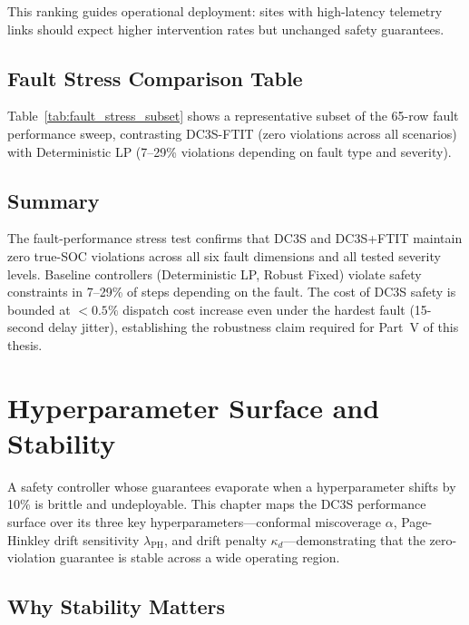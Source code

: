 This ranking guides operational deployment: sites with high-latency
telemetry links should expect higher intervention rates but unchanged
safety guarantees.

\subsection{Fault Stress Comparison Table}

Table~\ref{tab:fault_stress_subset} shows a representative subset of the
65-row fault performance sweep, contrasting DC3S-FTIT (zero violations
across all scenarios) with Deterministic LP (7--29\% violations depending
on fault type and severity).


\subsection{Summary}

The fault-performance stress test confirms that DC3S and DC3S+FTIT
maintain zero true-SOC violations across all six fault dimensions and
all tested severity levels.  Baseline controllers (Deterministic LP,
Robust Fixed) violate safety constraints in 7--29\% of steps depending
on the fault.  The cost of DC3S safety is bounded at $<0.5\%$ dispatch
cost increase even under the hardest fault (15-second delay jitter),
establishing the robustness claim required for Part~V of this thesis.



\section{Hyperparameter Surface and Stability}
\label{ch:hyperparameter}

A safety controller whose guarantees evaporate when a hyperparameter
shifts by 10\% is brittle and undeployable.  This chapter maps the
DC3S performance surface over its three key hyperparameters---conformal
miscoverage $\alpha$, Page-Hinkley drift sensitivity $\lambda_{\mathrm{PH}}$,
and drift penalty $\kappa_d$---demonstrating that the zero-violation
guarantee is stable across a wide operating region.

\subsection{Why Stability Matters}

